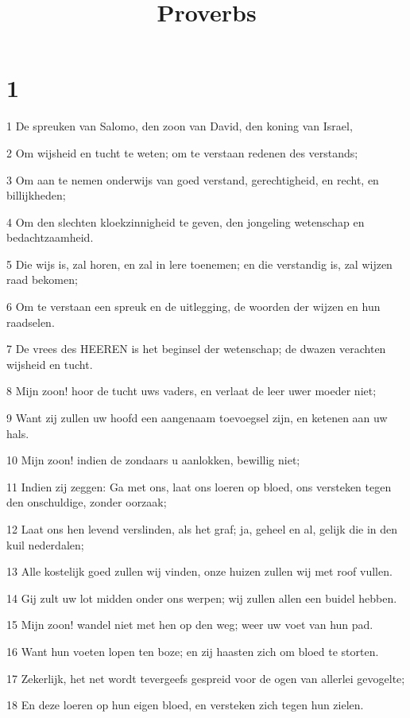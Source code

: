 

\title{Proverbs}



\chapter{1}

\par 1 De spreuken van Salomo, den zoon van David, den koning van Israel,
\par 2 Om wijsheid en tucht te weten; om te verstaan redenen des verstands;
\par 3 Om aan te nemen onderwijs van goed verstand, gerechtigheid, en recht, en billijkheden;
\par 4 Om den slechten kloekzinnigheid te geven, den jongeling wetenschap en bedachtzaamheid.
\par 5 Die wijs is, zal horen, en zal in lere toenemen; en die verstandig is, zal wijzen raad bekomen;
\par 6 Om te verstaan een spreuk en de uitlegging, de woorden der wijzen en hun raadselen.
\par 7 De vrees des HEEREN is het beginsel der wetenschap; de dwazen verachten wijsheid en tucht.
\par 8 Mijn zoon! hoor de tucht uws vaders, en verlaat de leer uwer moeder niet;
\par 9 Want zij zullen uw hoofd een aangenaam toevoegsel zijn, en ketenen aan uw hals.
\par 10 Mijn zoon! indien de zondaars u aanlokken, bewillig niet;
\par 11 Indien zij zeggen: Ga met ons, laat ons loeren op bloed, ons versteken tegen den onschuldige, zonder oorzaak;
\par 12 Laat ons hen levend verslinden, als het graf; ja, geheel en al, gelijk die in den kuil nederdalen;
\par 13 Alle kostelijk goed zullen wij vinden, onze huizen zullen wij met roof vullen.
\par 14 Gij zult uw lot midden onder ons werpen; wij zullen allen een buidel hebben.
\par 15 Mijn zoon! wandel niet met hen op den weg; weer uw voet van hun pad.
\par 16 Want hun voeten lopen ten boze; en zij haasten zich om bloed te storten.
\par 17 Zekerlijk, het net wordt tevergeefs gespreid voor de ogen van allerlei gevogelte;
\par 18 En deze loeren op hun eigen bloed, en versteken zich tegen hun zielen.
